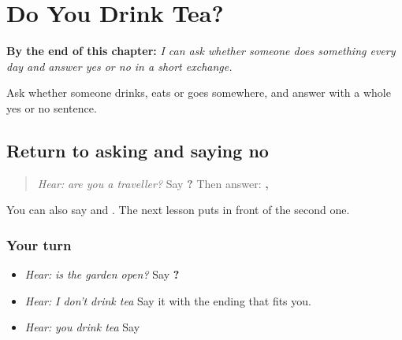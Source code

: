 
\chapter{Do You Drink Tea?}
\label{ch:pa-a2-polar-habitual}

\begin{chapteropening}
\textbf{By the end of this chapter:} \emph{I can ask whether someone does something every day and answer yes or no in a short exchange.}

Ask whether someone drinks, eats or goes somewhere, and answer with a whole yes or no sentence.
\end{chapteropening}

\section[\texorpdfstring{\pa{ਕੀ} \pa{ਤੁਸੀਂ} \pa{ਯਾਤਰੀ} \pa{ਹੋ}? … (kī tusīṁ yātrī …)}{ਕੀ ਤੁਸੀਂ ਯਾਤਰੀ ਹੋ? … (kī tusīṁ yātrī …)}]{Return to asking and saying no}

\label{lesson:PA-C215-ask-return}



\begin{quote}
\emph{Hear:} \emph{are you a traveller?} Say \textbf{   ?} Then answer: \textbf{ ,   }
\end{quote}

\begin{grammarlens}[title={Grammar Lens}]
You can also say \textbf{    } and \textbf{   }. The next lesson puts \textbf{} in front of the second one.
\end{grammarlens}

\subsection*{Your turn}
\begin{itemize}
\raggedright
  \item \emph{Hear:} \emph{is the garden open?} Say \textbf{   ?}
  \item \emph{Hear:} \emph{I don't drink tea} Say it with the ending that fits you.
  \item \emph{Hear:} \emph{you drink tea} Say \textbf{   }
\end{itemize}


